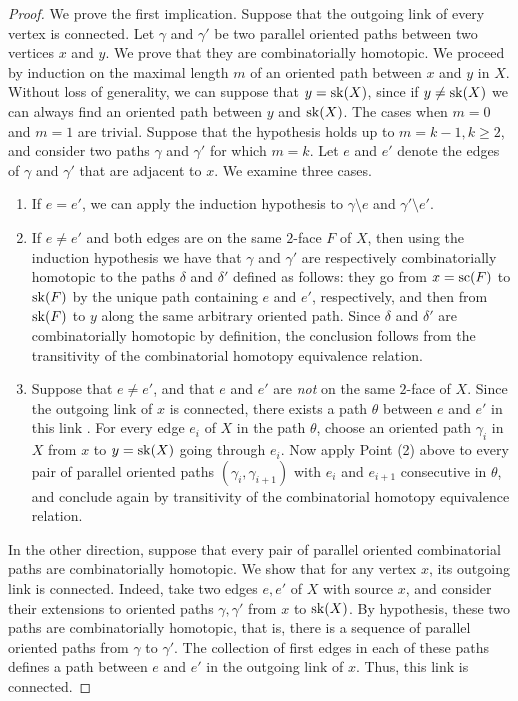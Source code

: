\begin{proof}
    We prove the first implication. 
    Suppose that the outgoing link of every vertex is connected. 
    Let $\gamma$ and $\gamma'$ be two parallel oriented paths between two vertices $x$ and $y$. 
    We prove that they are combinatorially homotopic. 
    We proceed by induction on the maximal length $m$ of an oriented path between $x$ and $y$ in $X$. 
    Without loss of generality, we can suppose that $y=\mathrm{sk}(X)$, since if $y\neq\mathrm{sk}(X)$ we can always find an oriented path between $y$ and $\mathrm{sk}(X)$.
    The cases when $m=0$ and $m=1$ are trivial. 
    Suppose that the hypothesis holds up to $m=k-1, k\geq 2$, and consider two paths $\gamma$ and $\gamma'$ for which $m=k$. 
    Let $e$ and $e'$ denote the edges of $\gamma$ and $\gamma'$ that are adjacent to $x$. 
    We examine three cases.
    \begin{enumerate}
        \item If $e=e'$, we can apply the induction hypothesis to $\gamma \setminus e$ and $\gamma' \setminus e'$. 
        \item If $e \neq e'$ and both edges are on the same $2$-face $F$ of $X$, then using the induction hypothesis we have that $\gamma$ and $\gamma'$ are respectively combinatorially homotopic to the paths $\delta$ and $\delta'$ defined as follows: they go from $x=\mathrm{sc}(F)$ to $\mathrm{sk}(F)$ by the unique path containing $e$ and $e'$, respectively, and then from $\mathrm{sk}(F)$ to $y$ along the same arbitrary oriented path. 
        Since $\delta$ and $\delta'$ are combinatorially homotopic by definition, the conclusion follows from the transitivity of the combinatorial homotopy equivalence relation. 
        \item Suppose that $e\neq e'$, and that $e$ and $e'$ are \emph{not} on the same $2$-face of $X$. 
        Since the outgoing link of $x$ is  connected, there exists a  path $\theta$ between  $e$ and $e'$ in this link . 
        For every edge $e_i$ of $X$ in the path $\theta$, choose an oriented path $\gamma_i$ in $X$ from $x$ to $y=\mathrm{sk}(X)$ going through $e_i$. 
        Now apply Point (2) above to every pair of parallel oriented paths $(\gamma_i, \gamma_{i+1})$ with $e_i$ and $e_{i+1}$ consecutive in $\theta$, and conclude again by transitivity of the combinatorial homotopy equivalence relation. 
    \end{enumerate}

    In the other direction, suppose that every pair of parallel oriented combinatorial paths are combinatorially homotopic. 
    We show that for any vertex $x$, its outgoing link is  connected. 
    Indeed, take two edges $e,e'$ of $X$ with source $x$, and consider their extensions to oriented paths $\gamma, \gamma'$ from $x$ to $\mathrm{sk}(X)$. 
    By hypothesis, these two paths are combinatorially homotopic, that is, there is a sequence of parallel oriented paths from $\gamma$ to $\gamma'$. 
    The collection of first edges in each of these paths defines a path between $e$ and $e'$ in the outgoing link of $x$. 
    Thus, this link is connected. 
\end{proof}

